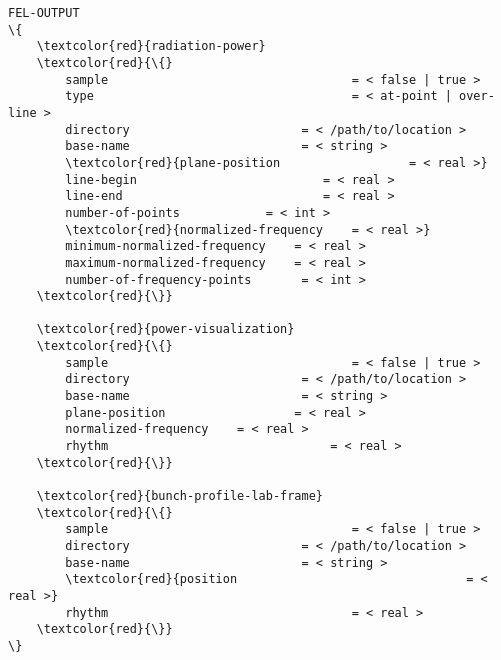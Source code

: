 \begin{multicols}{2}
\begin{Verbatim}[fontsize=\footnotesize, tabsize=2, fontfamily=courier,	fontseries=b, commandchars=\\\{\}]
FEL-OUTPUT
\{
	\textcolor{red}{radiation-power}
	\textcolor{red}{\{}
		sample  								= < false | true >
		type  									= < at-point | over-line >
		directory  						 = < /path/to/location >
		base-name  						 = < string >
		\textcolor{red}{plane-position  				= < real >}
		line-begin  						= < real >
		line-end  							= < real >
		number-of-points  			= < int >
		\textcolor{red}{normalized-frequency  	= < real >}
		minimum-normalized-frequency 	= < real >
		maximum-normalized-frequency 	= < real >
		number-of-frequency-points		 = < int >
	\textcolor{red}{\}}
	
	\textcolor{red}{power-visualization}
	\textcolor{red}{\{}
		sample  								= < false | true >
		directory  						 = < /path/to/location >
		base-name  						 = < string >
		plane-position  				= < real >
		normalized-frequency  	= < real >
		rhythm		 						 = < real >
	\textcolor{red}{\}}

	\textcolor{red}{bunch-profile-lab-frame}
	\textcolor{red}{\{}
		sample  								= < false | true >
		directory  						 = < /path/to/location >
		base-name  						 = < string >
		\textcolor{red}{position								= < real >}
		rhythm									= < real >
	\textcolor{red}{\}}
\}
\end{Verbatim}
\end{multicols}